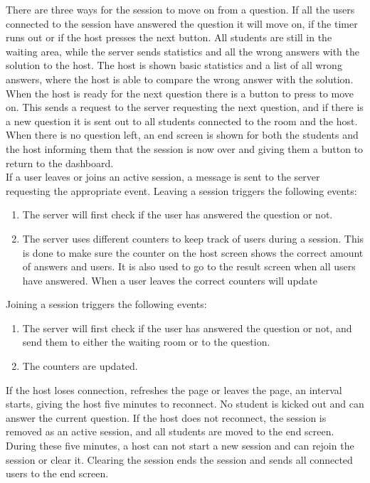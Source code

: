 \noindent
There are three ways for the session to move on from a question. If all the users connected to the session have answered the question it will move on, if the timer runs out or if the host presses the next button. All students are still in the waiting area, while the server sends statistics and all the wrong answers with the solution to the host. The host is shown basic statistics and a list of all wrong answers, where the host is able to compare the wrong answer with the solution. When the host is ready for the next question there is a button to press to move on. This sends a request to the server requesting the next question, and if there is a new question it is sent out to all students connected to the room and the host. When there is no question left, an end screen is shown for both the students and the host informing them that the session is now over and giving them a button to return to the dashboard.
\\[11pt]
If a user leaves or joins an active session, a message is sent to the server requesting the appropriate event. Leaving a session triggers the following events:
\begin{enumerate}
    \item The server will first check if the user has answered the question or not. 
    \item The server uses different counters to keep track of users during a session. This is done to make sure the counter on the host screen shows the correct amount of answers and users. It is also used to go to the result screen when all users have answered. When a user leaves the correct counters will update
\end{enumerate}
Joining a session triggers the following events:
\begin{enumerate}
    \item The server will first check if the user has answered the question or not, and send them to either the waiting room or to the question.
    \item The counters are updated.
\end{enumerate}
If the host loses connection, refreshes the page or leaves the page, an interval starts, giving the host five minutes to reconnect. No student is kicked out and can answer the current question. If the host does not reconnect, the session is removed as an active session, and all students are moved to the end screen. During these five minutes, a host can not start a new session and can rejoin the session or clear it. Clearing the session ends the session and sends all connected users to the end screen.